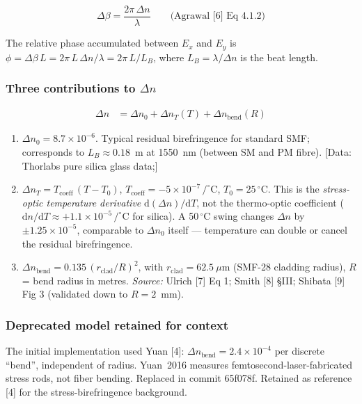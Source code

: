 \documentclass[11pt,a4paper]{article}
\newcommand{\datref}[1]{\textcolor{blue!60!black}{[Data: #1]}}
\begin{document}
\begin{equation}
  \Delta\beta = \frac{2\pi\,\Delta n}{\lambda}
  \qquad\text{(Agrawal [6] Eq 4.1.2)}
\end{equation}

The relative phase accumulated between $E_x$ and $E_y$ is
$\phi = \Delta\beta\,L = 2\pi\,L\,\Delta n/\lambda = 2\pi\,L/L_B$,
where $L_B = \lambda/\Delta n$ is the beat length.

\subsubsection{Three contributions to $\Delta n$}
\label{sec:biref-contributions}

\begin{align}
  \Delta n &= \Delta n_0 + \Delta n_T(T) + \Delta n_{\text{bend}}(R)
\end{align}

\begin{enumerate}[leftmargin=2em]
  \item[\textbf{Base}] $\Delta n_0 = 8.7\times10^{-6}$.
    Typical residual birefringence for standard SMF; corresponds to
    $L_B \approx 0.18$~m at 1550~nm (between SM and PM fibre).
    \datref{Thorlabs pure silica glass data;}

  \item[\textbf{Temperature}] $\Delta n_T = T_{\text{coeff}}\,(T - T_0)$,
    $T_{\text{coeff}} = -5\times10^{-7}\,/^\circ\text{C}$,
    $T_0 = 25\,^\circ\text{C}$.
    This is the \emph{stress-optic temperature derivative}
    $\mathrm{d}(\Delta n)/\mathrm{d}T$, not the thermo-optic coefficient
    ($\mathrm{d}n/\mathrm{d}T \approx +1.1\times10^{-5}\,/^\circ\text{C}$
    for silica).  A 50\,$^\circ$C swing changes $\Delta n$ by
    $\pm 1.25\times10^{-5}$, comparable to $\Delta n_0$ itself ---
    temperature can double or cancel the residual birefringence.

  \item[\textbf{Bending}] $\Delta n_{\text{bend}} =
    0.135\,(r_{\text{clad}}/R)^2$, with $r_{\text{clad}} = 62.5~\mu\text{m}$
    (SMF-28 cladding radius), $R$ = bend radius in metres.
    \emph{Source:} Ulrich [7] Eq 1; Smith [8] \S III; Shibata [9] Fig 3
    (validated down to $R = 2$~mm).
\end{enumerate}

\subsubsection{Deprecated model retained for context}
The initial implementation used Yuan [4]: $\Delta n_{\text{bend}} =
2.4\times10^{-4}$ per discrete \enquote{bend}, independent of radius.
Yuan~2016 measures femtosecond-laser-fabricated stress rods, not fiber
bending.  Replaced in commit 65f078f.  Retained as reference [4] for
the stress-birefringence background.
\end{document}
